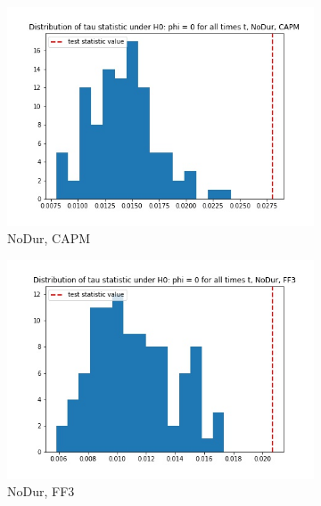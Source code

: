 \documentclass{article}
\begin{document}
  \begin{figure}
  \centering
  \begin{subfigure}[b]{0.3\textwidth}
    \centering
    \includegraphics[width=\textwidth]{NoDur/tau_hist_02_CAPM.jpg}
    \caption{NoDur, CAPM}
    \label{fig:1}
  \end{subfigure}
  \begin{subfigure}[b]{0.3\textwidth}
    \centering
    \includegraphics[width=\textwidth]{NoDur/tau_hist_02_FF3.jpg}
    \caption{NoDur, FF3}
    \label{fig:2}
  \end{subfigure}
    \begin{subfigure}[b]{0.3\textwidth}
    \centering

\end{subfigure}
\end{figure}
\end{document}
